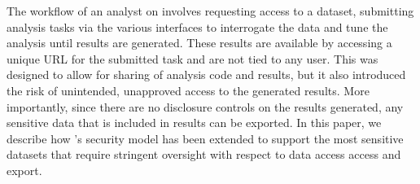 The workflow of an analyst on \NAME involves requesting access to a dataset, submitting analysis
tasks via the various interfaces \cite{babuji2017enabling} to interrogate the data and tune the analysis until results are generated.
These results are available by accessing a unique URL for the submitted task and are not tied to any user.
This was designed to allow for sharing of analysis code and results, but it also introduced the risk
of unintended, unapproved access to the generated results. More importantly, since there are no disclosure
controls on the results generated, any sensitive data that is included in results can be exported.
In this paper, we describe how \NAME's security model has been extended to support the most sensitive datasets
that require stringent oversight with respect to data access access and export.



